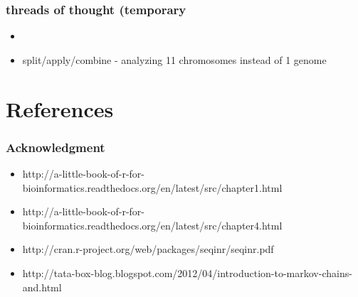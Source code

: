 \documentclass[xcolor=dvipsnames]{beamer} \usepackage{beamerthemesplit}
\begin{document}
\begin{frame}
	\frametitle{threads of thought (temporary}
    \begin{itemize}
    \item 
    \item split/apply/combine - analyzing 11 chromosomes instead of 1 genome
    \end{itemize}
\end{frame}


\section{References}
\begin{frame}
	\frametitle{Acknowledgment}
	\begin{itemize}
		\item http://a-little-book-of-r-for-bioinformatics.readthedocs.org/en/latest/src/chapter1.html
		\item http://a-little-book-of-r-for-bioinformatics.readthedocs.org/en/latest/src/chapter4.html
		\item http://cran.r-project.org/web/packages/seqinr/seqinr.pdf
		\item http://tata-box-blog.blogspot.com/2012/04/introduction-to-markov-chains-and.html

	\end{itemize}

\end{frame}
\end{document}
